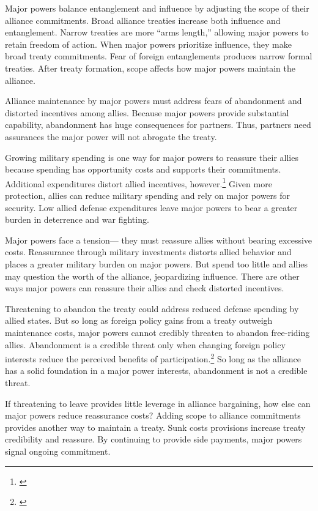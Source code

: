 \documentclass[12pt]{article}
\begin{document}
Major powers balance entanglement and influence by adjusting the scope of their alliance commitments. 
Broad alliance treaties increase both influence and entanglement. 
Narrow treaties are more ``arms length,'' allowing major powers to retain freedom of action. 
When major powers prioritize influence, they make broad treaty commitments.
Fear of foreign entanglements produces narrow formal treaties. 
After treaty formation, scope affects how major powers maintain the alliance. 


Alliance maintenance by major powers must address fears of abandonment and distorted incentives among allies. 
Because major powers provide substantial capability, abandonment has huge consequences for partners. 
Thus, partners need assurances the major power will not abrogate the treaty. 


Growing military spending is one way for major powers to reassure their allies because spending has opportunity costs and supports their commitments. 
Additional expenditures distort allied incentives, however.\footnote{\cite{Lake1996, Lake2009}}
Given more protection, allies can reduce military spending and rely on major powers for security.
Low allied defense expenditures leave major powers to bear a greater burden in deterrence and war fighting. 


Major powers face a tension--- they must reassure allies without bearing excessive costs.
Reassurance through military investments distorts allied behavior and places a greater military burden on major powers. 
But spend too little and allies may question the worth of the alliance, jeopardizing influence.   
There are other ways major powers can reassure their allies and check distorted incentives. 


Threatening to abandon the treaty could address reduced defense spending by allied states. 
But so long as foreign policy gains from a treaty outweigh maintenance costs, major powers cannot credibly threaten to abandon free-riding allies. 
Abandonment is a credible threat only when changing foreign policy interests reduce the perceived benefits of participation.\footnote{\cite{LeedsSavun2007}}
So long as the alliance has a solid foundation in a major power interests, abandonment is not a credible threat. 


If threatening to leave provides little leverage in alliance bargaining, how else can major powers reduce reassurance costs? 
Adding scope to alliance commitments provides another way to maintain a treaty.
Sunk costs provisions increase treaty credibility and reassure.
By continuing to provide side payments, major powers signal ongoing commitment. 
\end{document}
